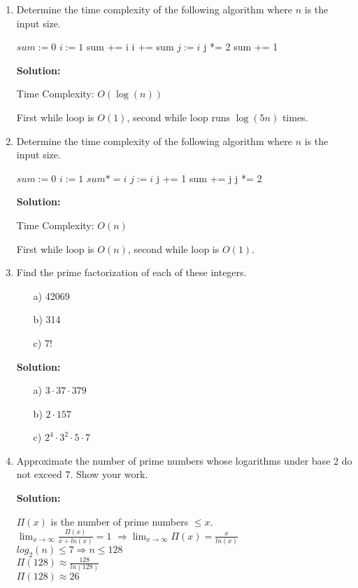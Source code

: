 \documentclass{article}
\newenvironment{solution}
{
\par
\color{blue}
\textbf{Solution:}
}
{
\par
}
\begin{document}
\begin{enumerate}

\item
{Determine the time complexity of the following algorithm where $n$ is the input size.}
\begin{algorithmic}
\State $sum := 0$
\State $i:=1$
    \State sum += i
    \State i += sum
    \EndWhile
\State $j := i$
    \State j *= 2
    \State sum += 1
    \EndWhile
\end{algorithmic}
    \begin{solution}
    Time Complexity: $O(\log{(n)})$
    
    First while loop is $O(1)$, second while loop runs $\log{(5n)}$ times.
    \end{solution}

\item
{Determine the time complexity of the following algorithm where $n$ is the input size.}
\begin{algorithmic}
\State $sum := 0$
\State $i:=1$
    \State $sum *= i$
\EndFor
\State $j := i$
    \State j += 1
    \State sum += j
    \State j *= 2
\EndWhile
\end{algorithmic}
    \begin{solution}
    Time Complexity: $O(n)$
    
    First while loop is $O(n)$, second while loop is $O(1)$.
    \end{solution}

\item Find the prime factorization of each of these integers.
\begin{enumerate}
    \item[a)] 42069
    \item[b)] 314
    \item[c)] 7!
\end{enumerate}
    \begin{solution}
    \begin{enumerate}
        \item[a)] $3 \cdot 37 \cdot 379$
        \item[b)] $2 \cdot 157$
        \item[c)] $2^4 \cdot 3^2 \cdot 5 \cdot 7$
    \end{enumerate}
    \end{solution}

\item Approximate the number of prime numbers whose logarithms under base 2 do not exceed 7. Show your work.
    \begin{solution}
    $\Pi(x)$ is the number of prime numbers $\leq x$.\\
    $\lim_{x \rightarrow \infty} \frac{\Pi(x)}{x \div ln(x)} = 1$
    $\Rightarrow \lim_{x \rightarrow \infty} \Pi(x) = \frac{x}{ln(x)}$\\
    $log_2(n) \leq 7 \Rightarrow n \leq 128$\\
    $\Pi(128) \approx \frac{128}{ln(128)}$\\
    $\Pi(128) \approx 26$
    \end{solution}


\end{enumerate}
\end{document}
